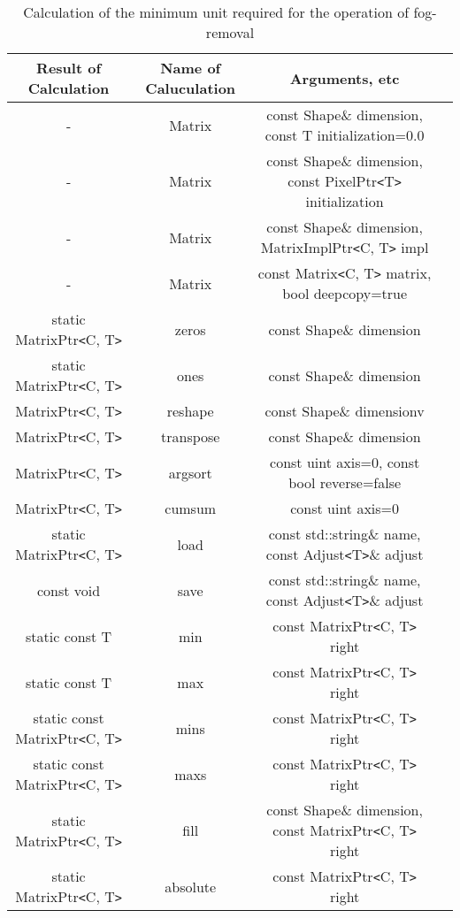 \documentclass{jsarticle}
\begin{document}
\begin{table}[htb]
  \caption{Calculation of the minimum unit required for the operation of fog-removal}
  \begin{tabular} {|c|c|c|c|} \hline
	Result of Calculation & Name of Caluculation & Arguments, etc \\ \hline
	- & Matrix & const Shape\& dimension, const T initialization=0.0 \\
	- & Matrix & const Shape\& dimension, const PixelPtr\verb*|<|T\verb*|>| initialization \\
	- & Matrix & const Shape\& dimension, MatrixImplPtr\verb*|<|C, T\verb*|>| impl \\
	- & Matrix & const Matrix\verb*|<|C, T\verb*|>| matrix, bool deepcopy=true \\
	static MatrixPtr\verb*|<|C, T\verb*|>| & zeros & const Shape\& dimension \\
	static MatrixPtr\verb*|<|C, T\verb*|>| & ones & const Shape\& dimension \\
	MatrixPtr\verb*|<|C, T\verb*|>| & reshape & const Shape\& dimensionv \\
	MatrixPtr\verb*|<|C, T\verb*|>| & transpose & const Shape\& dimension \\
	MatrixPtr\verb*|<|C, T\verb*|>| & argsort & const uint axis=0, const bool reverse=false \\
	MatrixPtr\verb*|<|C, T\verb*|>| & cumsum & const uint axis=0 \\
	static MatrixPtr\verb*|<|C, T\verb*|>| & load & const std::string\& name, const Adjust\verb*|<|T\verb*|>|\& adjust \\
	const void  & save & const std::string\& name, const Adjust\verb*|<|T\verb*|>|\& adjust \\
	static const T & min & const MatrixPtr\verb*|<|C, T\verb*|>| right \\
	static const T & max & const MatrixPtr\verb*|<|C, T\verb*|>| right \\
	static const MatrixPtr\verb*|<|C, T\verb*|>| & mins & const MatrixPtr\verb*|<|C, T\verb*|>| right \\
	static const MatrixPtr\verb*|<|C, T\verb*|>| & maxs & const MatrixPtr\verb*|<|C, T\verb*|>| right \\
	static MatrixPtr\verb*|<|C, T\verb*|>| & fill & const Shape\& dimension, const MatrixPtr\verb*|<|C, T\verb*|>| right \\
	static MatrixPtr\verb*|<|C, T\verb*|>| & absolute & const MatrixPtr\verb*|<|C, T\verb*|>| right \\

\end{tabular}
\end{table}
\end{document}

